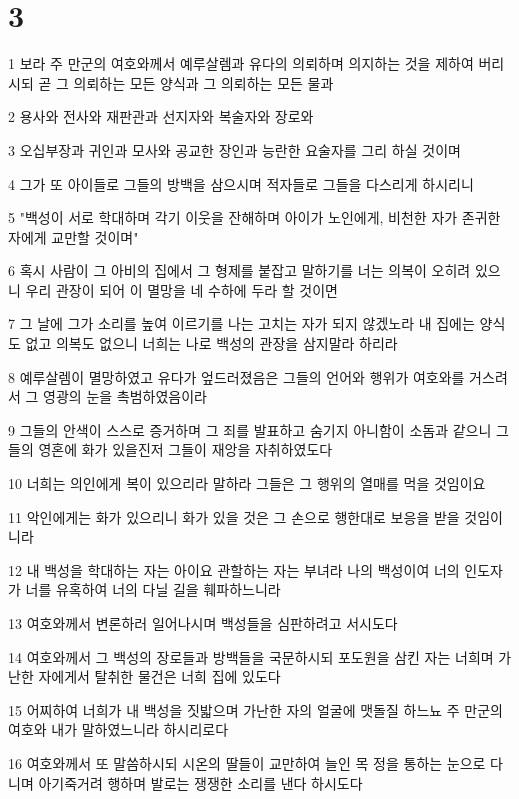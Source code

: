 \chapter{3}

\par 1 보라 주 만군의 여호와께서 예루살렘과 유다의 의뢰하며 의지하는 것을 제하여 버리시되 곧 그 의뢰하는 모든 양식과 그 의뢰하는 모든 물과
\par 2 용사와 전사와 재판관과 선지자와 복술자와 장로와
\par 3 오십부장과 귀인과 모사와 공교한 장인과 능란한 요술자를 그리 하실 것이며
\par 4 그가 또 아이들로 그들의 방백을 삼으시며 적자들로 그들을 다스리게 하시리니
\par 5 "백성이 서로 학대하며 각기 이웃을 잔해하며 아이가 노인에게, 비천한 자가 존귀한 자에게 교만할 것이며"
\par 6 혹시 사람이 그 아비의 집에서 그 형제를 붙잡고 말하기를 너는 의복이 오히려 있으니 우리 관장이 되어 이 멸망을 네 수하에 두라 할 것이면
\par 7 그 날에 그가 소리를 높여 이르기를 나는 고치는 자가 되지 않겠노라 내 집에는 양식도 없고 의복도 없으니 너희는 나로 백성의 관장을 삼지말라 하리라
\par 8 예루살렘이 멸망하였고 유다가 엎드러졌음은 그들의 언어와 행위가 여호와를 거스려서 그 영광의 눈을 촉범하였음이라
\par 9 그들의 안색이 스스로 증거하며 그 죄를 발표하고 숨기지 아니함이 소돔과 같으니 그들의 영혼에 화가 있을진저 그들이 재앙을 자취하였도다
\par 10 너희는 의인에게 복이 있으리라 말하라 그들은 그 행위의 열매를 먹을 것임이요
\par 11 악인에게는 화가 있으리니 화가 있을 것은 그 손으로 행한대로 보응을 받을 것임이니라
\par 12 내 백성을 학대하는 자는 아이요 관할하는 자는 부녀라 나의 백성이여 너의 인도자가 너를 유혹하여 너의 다닐 길을 훼파하느니라
\par 13 여호와께서 변론하러 일어나시며 백성들을 심판하려고 서시도다
\par 14 여호와께서 그 백성의 장로들과 방백들을 국문하시되 포도원을 삼킨 자는 너희며 가난한 자에게서 탈취한 물건은 너희 집에 있도다
\par 15 어찌하여 너희가 내 백성을 짓밟으며 가난한 자의 얼굴에 맷돌질 하느뇨 주 만군의 여호와 내가 말하였느니라 하시리로다
\par 16 여호와께서 또 말씀하시되 시온의 딸들이 교만하여 늘인 목 정을 통하는 눈으로 다니며 아기죽거려 행하며 발로는 쟁쟁한 소리를 낸다 하시도다

